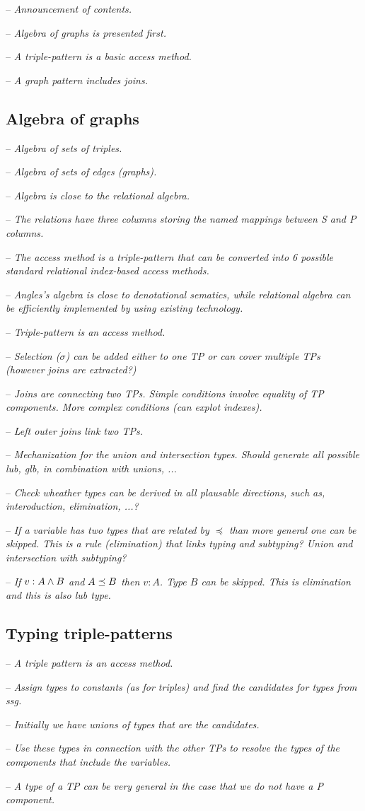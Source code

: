 \documentclass[runningheads]{llncs}
\newcommand{\notes}[1]{\noindent\begin{small}-- \emph{#1}\\\end{small}}
\begin{document}
\noindent
\notes{Announcement of contents.}
\notes{Algebra of graphs is presented first.}
\notes{A triple-pattern is a basic access method.}
\notes{A graph pattern includes joins.}

\subsection{Algebra of graphs}

\noindent
\notes{Algebra of sets of triples.}
\notes{Algebra of sets of edges (graphs).}

\noindent
\notes{Algebra is close to the relational algebra.}
\notes{The relations have three columns storing the named mappings between S and P columns.}
\notes{The access method is a triple-pattern that can be converted into 6 possible standard relational index-based access methods.}
\notes{Angles's algebra is close to denotational sematics, while relational algebra can be efficiently implemented by using existing technology.}

\noindent
\notes{Triple-pattern is an access method.}
\notes{Selection ($\sigma$) can be added either to one TP or can cover multiple TPs (however joins are extracted?)}
\notes{Joins are connecting two TPs. Simple conditions involve equality of TP components. More complex conditions (can explot indexes).}
\notes{Left outer joins link two TPs.}

\noindent
\notes{Mechanization for the union and intersection types. Should generate all possible lub, glb, in combination with unions, ...}
\notes{Check wheather types can be derived in all plausable directions, such as, interoduction, elimination, ...?}
\notes{If a variable has two types that are related by $\preceq$ than more general one can be skipped. This is a rule (elimination) that links typing and subtyping? Union and intersection with subtyping?}
\notes{If $v:A\land\/B$ and $A\preceq\/B$ then $v:A$. Type $B$ can be skipped. This is elimination and this is also lub type.}


\subsection{Typing triple-patterns}

\noindent
\notes{A triple pattern is an access method.}
\notes{Assign types to constants (as for triples) and find the candidates for types from ssg.}
\notes{Initially we have unions of types that are the candidates.}
\notes{Use these types in connection with the other TPs to resolve the types of the components that include the variables.}
\notes{A type of a TP can be very general in the case that we do not have a P component.}
\end{document}
